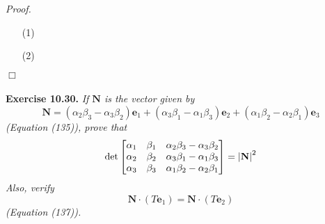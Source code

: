\documentclass{article}
\begin{document}
\emph{Proof.}
\begin{enumerate}
\item[(1)]
\item[(2)]

\end{enumerate}
$\Box$ \\\\






\textbf{Exercise 10.30.}
\emph{If $\mathbf{N}$ is the vector given by
\[
  \mathbf{N}
  = (\alpha_2 \beta_3 - \alpha_3 \beta_2) \mathbf{e}_1
    + (\alpha_3 \beta_1 - \alpha_1 \beta_3) \mathbf{e}_2
    + (\alpha_1 \beta_2 - \alpha_2 \beta_1) \mathbf{e}_3
\]
(Equation (135)), prove that
\[
  \det\begin{bmatrix}
    \alpha_1 & \beta_1 & \alpha_2 \beta_3 - \alpha_3 \beta_2 \\
    \alpha_2 & \beta_2 & \alpha_3 \beta_1 - \alpha_1 \beta_3 \\
    \alpha_3 & \beta_3 & \alpha_1 \beta_2 - \alpha_2 \beta_1
  \end{bmatrix}
  = \abs{\mathbf{N}}^2
\]
Also, verify
\[
  \mathbf{N} \cdot (T\mathbf{e}_1) = \mathbf{N} \cdot (T\mathbf{e}_2)
\]
(Equation (137)).} \\
\end{document}
